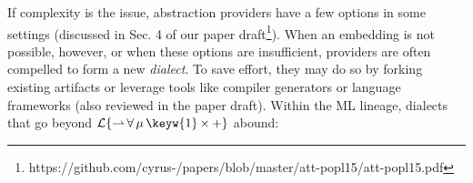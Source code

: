 If complexity is the issue, abstraction providers have a few options in some settings (discussed in Sec. 4 of our paper draft\footnote{https://github.com/cyrus-/papers/blob/master/att-popl15/att-popl15.pdf}). When an embedding is not possible, however, or when these options are  insufficient, providers are often compelled to form a new \emph{dialect}. To save effort, they may do so by forking existing artifacts or leverage tools like compiler generators or language frameworks (also reviewed in the paper draft). %
Within the ML lineage, dialects that go  beyond $\mathcal{L}\{{\rightharpoonup}\,{\forall}\,{\mu}\,{\keyw{1}}\,{\times}\,{+}\}$ abound:
%


